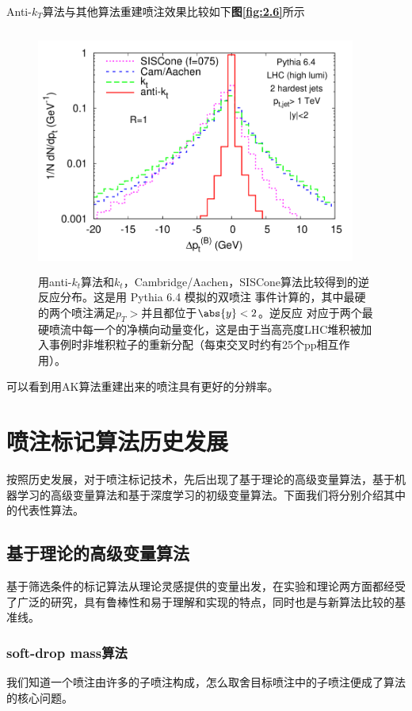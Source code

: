 Anti-$k_T$算法与其他算法重建喷注效果比较如下\textbf{图\ref{fig:2.6}}所示
\begin{figure}[H]
 \centering
 \includegraphics[height=8cm, width=10.5cm]{pictures/anti-kt.png}
 \caption{用anti-$k_t$算法和$k_t$，Cambridge/Aachen，SISCone算法比较得到的逆反应分布。这是用 Pythia 6.4 模拟的双喷注 事件计算的，其中最硬的两个喷注满足$p_T>$并且都位于$\abs{y}<2$。逆反应
对应于两个最硬喷流中每一个的净横向动量变化，这是由于当高亮度LHC堆积被加入事例时非堆积粒子的重新分配（每束交叉时约有25个pp相互作用）。\cite{The_anti-kt_jet_clustering_algorithm}}
 \label{fig:3.6}
\end{figure}
可以看到用AK算法重建出来的喷注具有更好的分辨率。

\section{喷注标记算法历史发展}
按照历史发展，对于喷注标记技术，先后出现了基于理论的高级变量算法，基于机器学习的高级变量算法和基于深度学习的初级变量算法\cite{jet-tagging-algorithms}。下面我们将分别介绍其中的代表性算法。
\subsection{基于理论的高级变量算法}
基于筛选条件的标记算法从理论灵感提供的变量出发，在实验和理论两方面都经受了广泛的研究，具有鲁棒性和易于理解和实现的特点，同时也是与新算法比较的基准线。
\subsubsection{soft-drop mass算法}
我们知道一个喷注由许多的子喷注构成，怎么取舍目标喷注中的子喷注便成了算法的核心问题。

